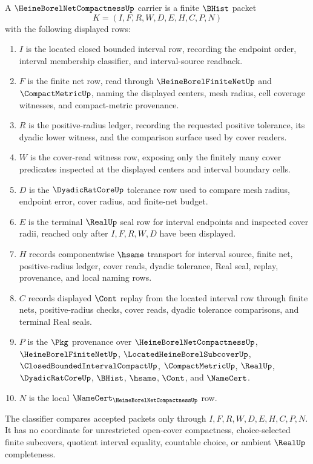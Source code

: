 \begin{definition}
\label{def:heine-borel-net-compactness-carrier}
A $\HeineBorelNetCompactnessUp$ carrier is a finite $\BHist$ packet
$$
K=(I,F,R,W,D,E,H,C,P,N)
$$
with the following displayed rows:
\begin{enumerate}
\item $I$ is the located closed bounded interval row, recording the endpoint order, interval membership classifier, and interval-source readback.
\item $F$ is the finite net row, read through $\HeineBorelFiniteNetUp$ and $\CompactMetricUp$, naming the displayed centers, mesh radius, cell coverage witnesses, and compact-metric provenance.
\item $R$ is the positive-radius ledger, recording the requested positive tolerance, its dyadic lower witness, and the comparison surface used by cover readers.
\item $W$ is the cover-read witness row, exposing only the finitely many cover predicates inspected at the displayed centers and interval boundary cells.
\item $D$ is the $\DyadicRatCoreUp$ tolerance row used to compare mesh radius, endpoint error, cover radius, and finite-net budget.
\item $E$ is the terminal $\RealUp$ seal row for interval endpoints and inspected cover radii, reached only after $I,F,R,W,D$ have been displayed.
\item $H$ records componentwise $\hsame$ transport for interval source, finite net, positive-radius ledger, cover reads, dyadic tolerance, Real seal, replay, provenance, and local naming rows.
\item $C$ records displayed $\Cont$ replay from the located interval row through finite nets, positive-radius checks, cover reads, dyadic tolerance comparisons, and terminal Real seals.
\item $P$ is the $\Pkg$ provenance over $\HeineBorelNetCompactnessUp$, $\HeineBorelFiniteNetUp$, $\LocatedHeineBorelSubcoverUp$, $\ClosedBoundedIntervalCompactUp$, $\CompactMetricUp$, $\RealUp$, $\DyadicRatCoreUp$, $\BHist$, $\hsame$, $\Cont$, and $\NameCert$.
\item $N$ is the local $\NameCert_{\HeineBorelNetCompactnessUp}$ row.
\end{enumerate}
The classifier compares accepted packets only through $I,F,R,W,D,E,H,C,P,N$. It has no coordinate for unrestricted open-cover compactness, choice-selected finite subcovers, quotient interval equality, countable choice, or ambient $\RealUp$ completeness.
\end{definition}

